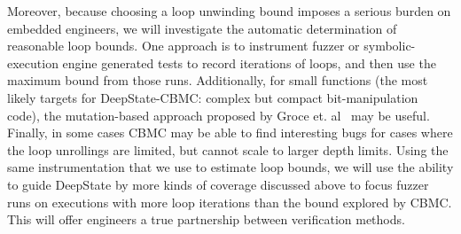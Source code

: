 Moreover, because choosing a loop unwinding bound imposes a serious burden on embedded engineers, we will investigate the automatic determination of reasonable loop bounds.  One approach is to instrument fuzzer or symbolic-execution engine generated tests to record iterations of loops, and then use the maximum bound from those runs.  Additionally, for small functions (the most likely targets for DeepState-CBMC: complex but compact bit-manipulation code), the mutation-based approach proposed by Groce et. al~\cite{groce2018verified} may be useful.  Finally, in some cases CBMC may be able to find interesting bugs for cases where the loop unrollings are limited, but cannot scale to larger depth limits.  Using the same instrumentation that we use to estimate loop bounds, we will use the ability to guide DeepState by more kinds of coverage discussed above to focus fuzzer runs on executions with more loop iterations than the bound explored by CBMC.  This will offer engineers a true partnership between verification methods. 